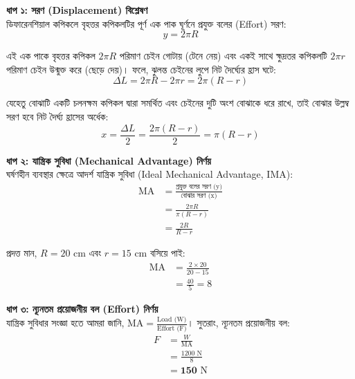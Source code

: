 \documentclass[12pt, a4paper]{article}
\begin{document}
\begin{tcolorbox}[solutionbox={সমাধান (Solution)}]
    \noindent
    \textbf{ধাপ ১: সরণ (Displacement) বিশ্লেষণ} \\
    ডিফারেনশিয়াল কপিকলে বৃহত্তর কপিকলটির পূর্ণ এক পাক ঘূর্ণনে প্রযুক্ত বলের (Effort) সরণ:
    \[ y = 2\pi R \]
    
    এই এক পাকে বৃহত্তর কপিকল $2\pi R$ পরিমাণ চেইন গোটায় (টেনে নেয়) এবং একই সাথে ক্ষুদ্রতর কপিকলটি $2\pi r$ পরিমাণ চেইন উন্মুক্ত করে (ছেড়ে দেয়)। 
    ফলে, ঝুলন্ত চেইনের লুপে নিট দৈর্ঘ্যের হ্রাস ঘটে:
    \[ \Delta L = 2\pi R - 2\pi r = 2\pi (R - r) \]
    
    যেহেতু বোঝাটি একটি চলনক্ষম কপিকল দ্বারা সমর্থিত এবং চেইনের দুটি অংশ বোঝাকে ধরে রাখে, তাই বোঝার উল্লম্ব সরণ হবে নিট দৈর্ঘ্য হ্রাসের অর্ধেক:
    \[ x = \frac{\Delta L}{2} = \frac{2\pi (R - r)}{2} = \pi (R - r) \]
    
    \vspace{0.5em}
    \noindent\textbf{ধাপ ২: যান্ত্রিক সুবিধা (Mechanical Advantage) নির্ণয়} \\
    ঘর্ষণহীন ব্যবস্থার ক্ষেত্রে আদর্শ যান্ত্রিক সুবিধা (Ideal Mechanical Advantage, IMA):
    \begin{align*}
        \text{MA} &= \frac{\text{প্রযুক্ত বলের সরণ (y)}}{\text{বোঝার সরণ (x)}} \\
                  &= \frac{2\pi R}{\pi (R - r)} \\
                  &= \frac{2R}{R - r}
    \end{align*}
    
    প্রদত্ত মান, $R = 20\text{ cm}$ এবং $r = 15\text{ cm}$ বসিয়ে পাই:
    \begin{align*}
        \text{MA} &= \frac{2 \times 20}{20 - 15} \\
                  &= \frac{40}{5} = 8
    \end{align*}
    
    \vspace{0.5em}
    \noindent\textbf{ধাপ ৩: ন্যূনতম প্রয়োজনীয় বল (Effort) নির্ণয়} \\
    যান্ত্রিক সুবিধার সংজ্ঞা হতে আমরা জানি, $\text{MA} = \frac{\text{Load (W)}}{\text{Effort (F)}}$। 
    সুতরাং, ন্যূনতম প্রয়োজনীয় বল:
    \begin{align*}
        F &= \frac{W}{\text{MA}} \\
          &= \frac{1200\text{ N}}{8} \\
          &= \mathbf{150}\text{ N}
    \end{align*}
\end{tcolorbox}
\end{document}

